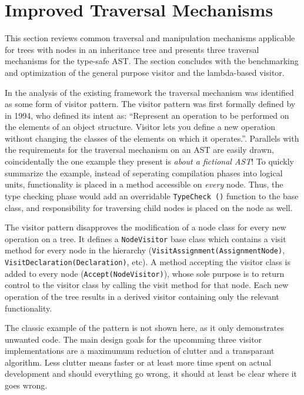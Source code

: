 \documentclass[twoside,openright]{uva-bachelor-thesis}
\newcommand{\code}[1]{\texttt{\footnotesize#1}}
\begin{document}
	\section{Improved Traversal Mechanisms}
		This section reviews common traversal and manipulation mechanisms applicable for trees with nodes in an inheritance tree and presents three traversal mechanisms for the type-safe AST. The section concludes with the benchmarking and optimization of the general purpose visitor and the lambda-based visitor. 
				
		In the analysis of the existing framework the traversal mechanism was identified as some form of visitor pattern. The visitor pattern was first formally defined by \citeauthor{gof1994} in 1994, who defined its intent as: ``Represent an operation to be performed on the elements of an object structure. Visitor lets you define a new operation without changing the classes of the elements on which it operates.''. Parallels with the requirements for the traversal mechanism on an AST are easily drawn, coincidentally the one example they present is \emph{about a fictional AST}! To quickly summarize the example, instead of seperating compilation phases into logical units, functionality is placed in a method accessible on \emph{every} node. Thus, the type checking phase would add an overridable \code{TypeCheck ()} function to the base class, and responsibility for traversing child nodes is placed on the node as well.
		
		The visitor pattern disapproves the modification of a node class for every new operation on a tree. It defines a \code{NodeVisitor} base class which contains a visit method for every node in the hierarchy (\code{VisitAssignment(AssignmentNode)}, \code{VisitDeclaration(Declaration)}, etc). A method accepting the visitor class is added to every node (\code{Accept(NodeVisitor)}), whose sole purpose is to return control to the visitor class by calling the visit method for that node. Each new operation of the tree results in a derived visitor containing only the relevant functionality.
		
		The classic example of the pattern is not shown here, as it only demonstrates unwanted code. The main design goals for the upcomming three visitor implementations are a maximumum reduction of clutter and a transparant algorithm. Less clutter means faster or at least more time spent on actual development and should everything go wrong, it should at least be clear where it goes wrong.
		
\end{document}
